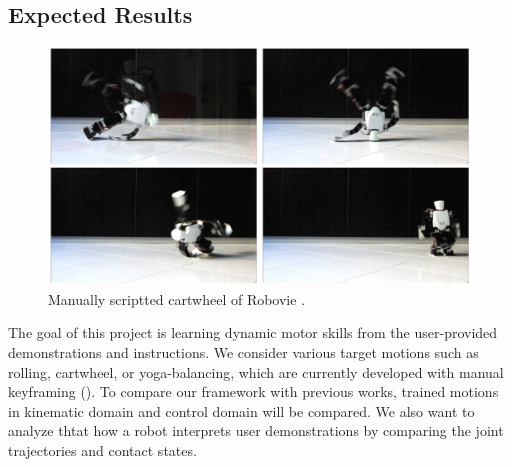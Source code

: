 \subsection{Expected Results}

\begin{figure}[htbp]
\center
  \includegraphics[width=5.0in]{images/training2_cartwheel}
  \caption{Manually scriptted cartwheel of Robovie \cite{Youtube-Robovie-X}.}
 \label{fig:cartwheel}
\end{figure}

The goal of this project is learning dynamic motor skills
from the user-provided demonstrations and instructions.
We consider various target motions 
such as rolling, cartwheel, or yoga-balancing,
which are currently developed with manual keyframing ().
To compare our framework with previous works, trained motions 
in kinematic domain and control domain will be compared.
We also want to analyze thtat how a robot interprets user demonstrations
by comparing the joint trajectories and contact states.

